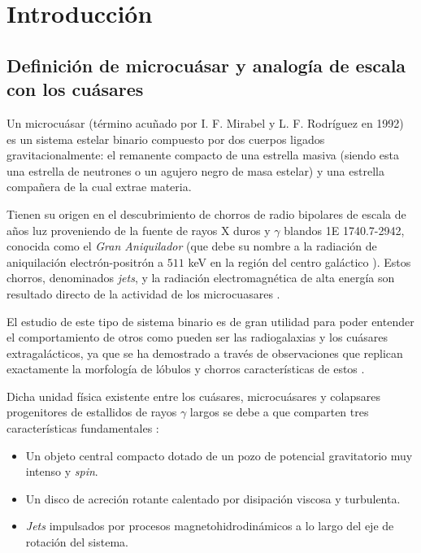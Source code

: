 \section{Introducción}

\subsection{Definición de microcuásar y analogía de escala con los cuásares}
\noindent Un microcuásar (término acuñado por I. F. Mirabel y L. F. Rodríguez en 1992) es un sistema estelar binario compuesto por dos cuerpos ligados gravitacionalmente: el remanente compacto de una estrella masiva (siendo esta una estrella de neutrones o un agujero negro de masa estelar) y una estrella compañera de la cual extrae materia. 

Tienen su origen en el descubrimiento de chorros de radio bipolares de escala de años luz proveniendo de la fuente de rayos X duros y $\gamma$ blandos 1E 1740.7-2942, conocida como el \textit{Gran Aniquilador} (que debe su nombre a la radiación de aniquilación electrón-positrón a $511$ keV en la región del centro galáctico \cite{mirabel,mornas2026bloque1}). Estos chorros, denominados \textit{jets}, y la radiación electromagnética de alta energía son resultado directo de la actividad de los microcuasares \cite{chaty,mirabel,paredes}. 

El estudio de este tipo de sistema binario es de gran utilidad para poder entender el comportamiento de otros como pueden ser las radiogalaxias y los cuásares extragalácticos, ya que se ha demostrado a través de observaciones que replican exactamente la morfología de lóbulos y chorros características de estos \cite{mirabel}. 

Dicha unidad física existente entre los cuásares, microcuásares y colapsares progenitores de estallidos de rayos $\gamma$ largos se debe a que comparten tres características fundamentales \cite{mirabel}:
\begin{itemize}
    \item[$\bullet$] Un objeto central compacto dotado de un pozo de potencial gravitatorio muy intenso y \textit{spin}.
    \item[$\bullet$] Un disco de acreción rotante calentado por disipación viscosa y turbulenta.
    \item[$\bullet$] \textit{Jets} impulsados por procesos magnetohidrodinámicos a lo largo del eje de rotación del sistema.
\end{itemize}


